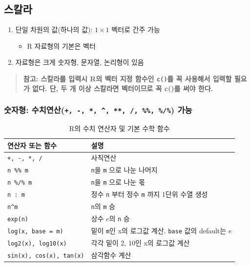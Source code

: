 \documentclass[11pt,a4paper]{book}
\providecommand{\tightlist}{%
  \setlength{\itemsep}{0pt}\setlength{\parskip}{0pt}}
\theoremstyle{definition}
\theoremstyle{definition}
\theoremstyle{definition}
\theoremstyle{remark}
\begin{document}
\subsection{스칼라}

\begin{enumerate}
\def\labelenumi{\arabic{enumi}.}
\tightlist
\item
  단일 차원의 값(하나의 값): \(1 \times 1\) 벡터로 간주 가능

  \begin{itemize}
  \tightlist
  \item
    R 자료형의 기본은 벡터
  \end{itemize}
\item
  자료형은 크게 숫자형, 문자열, 논리형이 있음
\end{enumerate}

\begin{quote}
\textbf{참고: 스칼라를 입력시 R의 벡터 지정 함수인 \texttt{c()}를 꼭
사용해서 입력할 필요가 없다. 단, 두 개 이상 스칼라면 벡터이므로 꼭 c()를
써야 한다.}
\end{quote}

\subsubsection{\texorpdfstring{숫자형:
수치연산(\texttt{+,\ -,\ *,\ \^{},\ **,\ /,\ \%\%,\ \%/\%})
가능}{숫자형: 수치연산(+, -, *, \^{}, **, /, \%\%, \%/\%) 가능}}\label{----}

\begin{table}[H]
  \centering
  \begingroup\footnotesize
  \caption{R의 수치 연산자 및 기본 수학 함수}
  \begin{tabular}{p{5cm}p{7cm}}
  \toprule
  \textbf{연산자 또는 함수} & \textbf{설명} \\
  \midrule
  \texttt{+, -, *, /} & 사칙연산 \\
  \texttt{n \%\% m} & \texttt{n}을 \texttt{m} 으로 나눈 나머지 \\
  \texttt{n \%/\% m} & \texttt{n}을 \texttt{m} 으로 나눈 몫 \\
  \texttt{n : m} & 정수 \texttt{n} 부터 정수 \texttt{m} 까지 1단위 수열 생성 \\
  \texttt{n\textasciicircum m} & \texttt{n}의 \texttt{m} 승 \\
  \texttt{exp(n)} & 상수 $e$의 \texttt{n} 승 \\
  \texttt{log(x, base = m)} & 밑이 \texttt{m}인 x의 로그값 계산. \texttt{base} 값의 default는 $e$ \\
  \texttt{log2(x), log10(x)} & 각각 밑이 2, 10인 x의 로그값 계산 \\
  \texttt{sin(x), cos(x), tan(x)} & 삼각함수 계산 \\
  \bottomrule
  \end{tabular}
  \endgroup
\end{table}
\end{document}
